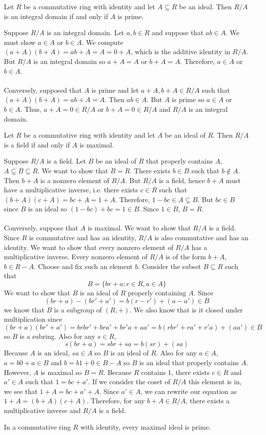 \documentclass[11pt,letterpaper]{jacky}
\begin{document}
\begin{bthm}
    Let $R$ be a commutative ring with identity and let $A\subseteq R$ be an ideal. Then $R/A$ is an integral domain if and only if $A$ is prime.
\end{bthm}

\begin{bpf}
    Suppose $R/A$ is an integral domain. Let $a,b\in R$ and suppose that $ab\in A$. We must show $a\in A$ or $b\in A$. We compute $(a+A)(b+A)=ab+A=A=0+A$, which is the additive identity in $R/A$. But $R/A$ is an integral domain so $a+A=A$ or $b+A=A$. Therefore, $a\in A$ or $b\in A$.\\\\
    Conversely, supposed that $A$ is prime and let $a+A,b+A\in R/A$ such that $(a+A)(b+A)=ab+A=A$. Then $ab\in A$. But $A$ is prime so $a\in A$ or $b\in A$. Thus, $a+A=0\in R/A$ or $b+A=0\in R/A$ and $R/A$ is an integral domain.
\end{bpf}

\begin{bthm}
    Let $R$ be a commutative ring with identity and let $A$ be an ideal of $R$. Then $R/A$ is a field if and only if $A$ is maximal.
\end{bthm}

\begin{bpf}
    Suppose $R/A$ is a field. Let $B$ be an ideal of $R$ that properly contains $A$, $A\subsetneq B\subseteq R$. We want to show that $B=R$. There exists $b\in B$ such that $b\notin A$. Then $b+A$ is a nonzero element of $R/A$. But $R/A$ is a field, hence $b+A$ must have a multiplicative inverse, i.e. there exists $c\in R$ such that $(b+A)(c+A)=bc+A=1+A$. Therefore, $1-bc\in A\subsetneq B$. But $bc\in B$ since $B$ is an ideal so $(1-bc)+bc=1\in B$. Since $1\in B$, $B=R$.\\\\
    Conversely, suppose that $A$ is maximal. We want to show that $R/A$ is a field. Since $R$ is commutative and has an identity, $R/A$ is also commutative and has an identity. We want to show that every nonzero element of $R/A$ has a multiplicative inverse. Every nonzero element of $R/A$ is of the form $b+A$, $b\in R-A$. Choose and fix such an element $b$. Consider the subset $B\subseteq R$ such that
    $$B=\{br+a:r\in R,a\in A\}$$
    We want to show that $B$ is an ideal of $R$ properly containing $A$. Since
    $$(br+a)-(br'+a')=b(r-r')+(a-a')\in B$$
    we know that $B$ is a subgroup of $(R,+)$. We also know that is it closed under multiplication since
    $$(br+a)(br'+a')=brbr'+bra'+br'a+aa'=b(rbr'+ra'+r'a)+(aa')\in B$$
    so $B$ is a subring. Also for any $s\in R$,
    $$s(br+a)=sbr+sa=b(sr)+(sa)$$
    Because $A$ is an ideal, $sa\in A$ so $B$ is an ideal of $R$. Also for any $a\in A$, $a=b0+a\in B$ and $b=b1+0\in B-A$ so $B$ is an ideal that properly contains $A$. However, $A$ is maximal so $B=R$. Because $R$ contains 1, there exists $c\in R$ and $a'\in A$ such that $1=bc+a'$. If we consider the coset of $R/A$ this element is in, we see that $1+A=bc+a'+A$. Since $a'\in A$, we can rewrite our equation as $1+A=(b+A)(c+A)$. Therefore, for any $b+A\in R/A$, there exists a multiplicative inverse and $R/A$ is a field.
\end{bpf}

\begin{prop}
    In a commutative ring $R$ with identity, every maximal ideal is prime.
\end{prop}
\end{document}
